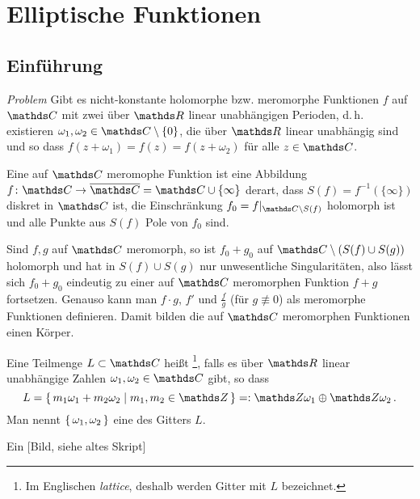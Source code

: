 \section{Elliptische Funktionen}

\subsection{Einführung}

\emph{Problem} Gibt es nicht-konstante holomorphe bzw. meromorphe Funktionen $f$ auf $\CC$ mit zwei über $\RR$ linear unabhängigen Perioden, d.\,h. existieren $\omega_1, \omega_2 \in \CC\setminus\{0\}$, die über $\RR$ linear unabhängig sind und so dass $f(z+\omega_1) = f(z) = f(z+\omega_2)$ für alle $z\in\CC$.

\begin{erin}
Eine auf $\CC$ meromophe Funktion ist eine Abbildung $f\colon \CC \ra \closure \CC = \CC \cup \{\infty\}$ derart, dass $S(f) = f^{-1}(\{\infty\})$ diskret in $\CC$ ist, die Einschränkung $f_0 = f|_{\CC\setminus S(f)}$ holomorph ist und alle Punkte aus $S(f)$ Pole von $f_0$ sind.

Sind $f, g$ auf $\CC$ meromorph, so ist $f_0 + g_0$ auf $\CC\setminus(S(f) \cup S(g))$ holomorph und hat in $S(f) \cup S(g)$ nur unwesentliche Singularitäten, also lässt sich $f_0 + g_0$ eindeutig zu einer auf $\CC$ meromorphen Funktion $f+g$ fortsetzen.
Genauso kann man $f\cdot g$, $f'$ und $\frac{f}{g}$ (für $g\not\equiv 0$) als meromorphe Funktionen definieren. Damit bilden die auf $\CC$ meromorphen Funktionen einen Körper.
\end{erin}

\begin{defi}
Eine Teilmenge $L \subset \CC$ heißt \footnote{Im Englischen \emph{lattice}, deshalb werden Gitter mit $L$ bezeichnet.}, falls es über $\RR$ linear unabhängige Zahlen $\omega_1, \omega_2\in\CC$ gibt, so dass
\[
	L = \Set{ m_1\omega_1 + m_2 \omega_2 \mid m_1, m_2 \in \ZZ}
	=: \ZZ\omega_1 \oplus \ZZ\omega_2
	\,.
\]
Man nennt $\left\{\,\omega_1, \omega_2\,\right\}$ eine  des Gitters $L$.
\end{defi}

\begin{bsp}
Ein [Bild, siehe altes Skript]
\end{bsp}


